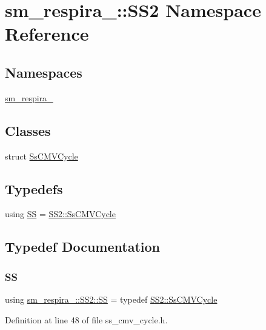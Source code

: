 \hypertarget{namespacesm__respira__1_1_1SS2}{}\section{sm\+\_\+respira\+\_\+:\+:S\+S2 Namespace Reference}
\label{namespacesm__respira__1_1_1SS2}
\subsection*{Namespaces}
\begin{DoxyCompactItemize}
\item 
 \hyperlink{namespacesm__respira__1_1_1SS2_1_1sm__respira__1}{sm\+\_\+respira\+\_}
\end{DoxyCompactItemize}
\subsection*{Classes}
\begin{DoxyCompactItemize}
\item 
struct \hyperlink{structsm__respira__1_1_1SS2_1_1SsCMVCycle}{Ss\+C\+M\+V\+Cycle}
\end{DoxyCompactItemize}
\subsection*{Typedefs}
\begin{DoxyCompactItemize}
\item 
using \hyperlink{namespacesm__respira__1_1_1SS2_a7fd0a7d8be6548b814d37263b7508763}{SS} = \hyperlink{structsm__respira__1_1_1SS2_1_1SsCMVCycle}{S\+S2\+::\+Ss\+C\+M\+V\+Cycle}
\end{DoxyCompactItemize}


\subsection{Typedef Documentation}
\mbox{\label{namespacesm__respira__1_1_1SS2_a7fd0a7d8be6548b814d37263b7508763}} 
\subsubsection{\texorpdfstring{SS}{SS}}
{\footnotesize\ttfamily using \hyperlink{namespacesm__respira__1_1_1SS2_a7fd0a7d8be6548b814d37263b7508763}{sm\+\_\+respira\+\_\+::\+S\+S2\+::\+SS} = typedef \hyperlink{structsm__respira__1_1_1SS2_1_1SsCMVCycle}{S\+S2\+::\+Ss\+C\+M\+V\+Cycle}}



Definition at line 48 of file ss\+\_\+cmv\+\_\+cycle.\+h.


